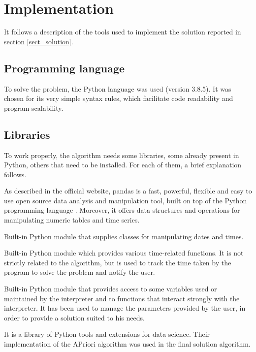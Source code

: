 
\section{Implementation}
It follows a description of the tools used to implement the solution reported in section \ref{sect_solution}.

\subsection*{Programming language}
To solve the problem, the Python language was used (version 3.8.5). It was chosen for its very simple syntax rules, which facilitate code readability and program scalability.

\subsection*{Libraries}
To work properly, the algorithm needs some libraries, some already present in Python, others that need to be installed. For each of them, a brief explanation follows.

\vspace{2mm}
 As described in the official website, pandas is a fast, powerful, flexible and easy to use open source data analysis and manipulation tool, built on top of the Python programming language \cite{pandas}. Moreover, it offers data structures and operations for manipulating numeric tables and time series.

\vspace{2mm}
 Built-in Python module that supplies classes for manipulating dates and times.

\vspace{2mm}
 Built-in Python module which provides various time-related functions. It is not strictly related to the algorithm, but is used to track the time taken by the program to solve the problem and notify the user.

\vspace{2mm}
 Built-in Python module that provides access to some variables used or maintained by the interpreter and to functions that interact strongly with the interpreter. It has been used to manage the parameters provided by the user, in order to provide a solution suited to his needs.

\vspace{2mm}
 It is a library of Python tools and extensions for data science. Their implementation of the APriori algorithm was used in the final solution algorithm.

